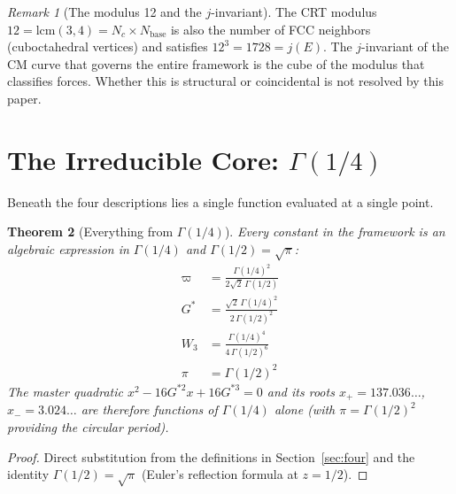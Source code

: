 \documentclass[12pt]{article}
\newtheorem{theorem}{Theorem}[section]
\theoremstyle{definition}
\theoremstyle{remark}
\newtheorem{remark}[theorem]{Remark}
\begin{document}
\begin{remark}[The modulus 12 and the $j$-invariant]
The CRT modulus $12 = \mathrm{lcm}(3,4) = N_c \times N_\mathrm{base}$ is also the number of FCC neighbors (cuboctahedral vertices) and satisfies $12^3 = 1728 = j(E)$. The $j$-invariant of the CM curve that governs the entire framework is the cube of the modulus that classifies forces. Whether this is structural or coincidental is not resolved by this paper.
\end{remark}

\section{The Irreducible Core: $\Gamma(1/4)$}
\label{sec:gamma}

Beneath the four descriptions lies a single function evaluated at a single point.

\begin{theorem}[Everything from $\Gamma(1/4)$]
\label{thm:gamma}
Every constant in the framework is an algebraic expression in $\Gamma(1/4)$ and $\Gamma(1/2) = \sqrt{\pi}$:
\begin{align}
    \varpi &= \frac{\Gamma(1/4)^2}{2\sqrt{2}\,\Gamma(1/2)} \\[4pt]
    G^* &= \frac{\sqrt{2}\,\Gamma(1/4)^2}{2\,\Gamma(1/2)^2} \\[4pt]
    W_3 &= \frac{\Gamma(1/4)^4}{4\,\Gamma(1/2)^6} \\[4pt]
    \pi &= \Gamma(1/2)^2
\end{align}
The master quadratic $x^2 - 16G^{*2}x + 16G^{*3} = 0$ and its roots $x_+ = 137.036\ldots$, $x_- = 3.024\ldots$ are therefore functions of $\Gamma(1/4)$ alone \emph{(}with $\pi = \Gamma(1/2)^2$ providing the circular period\emph{)}.
\end{theorem}

\begin{proof}
Direct substitution from the definitions in Section~\ref{sec:four} and the identity $\Gamma(1/2) = \sqrt{\pi}$ (Euler's reflection formula at $z = 1/2$). \qedhere
\end{proof}
\end{document}
